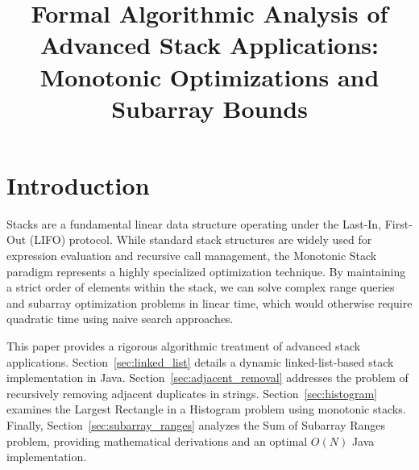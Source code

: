 \documentclass[10pt,journal,compsoc,onecolumn]{IEEEtran}
\begin{document}
\title{Formal Algorithmic Analysis of Advanced Stack Applications: Monotonic Optimizations and Subarray Bounds}


\maketitle
\IEEEdisplaynontitleabstractindextext
\IEEEpeerreviewmaketitle

\section{Introduction}
Stacks are a fundamental linear data structure operating under the Last-In, First-Out (LIFO) protocol. While standard stack structures are widely used for expression evaluation and recursive call management, the Monotonic Stack paradigm represents a highly specialized optimization technique. By maintaining a strict order of elements within the stack, we can solve complex range queries and subarray optimization problems in linear time, which would otherwise require quadratic time using naive search approaches.

This paper provides a rigorous algorithmic treatment of advanced stack applications. Section~\ref{sec:linked_list} details a dynamic linked-list-based stack implementation in Java. Section~\ref{sec:adjacent_removal} addresses the problem of recursively removing adjacent duplicates in strings. Section~\ref{sec:histogram} examines the Largest Rectangle in a Histogram problem using monotonic stacks. Finally, Section~\ref{sec:subarray_ranges} analyzes the Sum of Subarray Ranges problem, providing mathematical derivations and an optimal $O(N)$ Java implementation.
\end{document}
